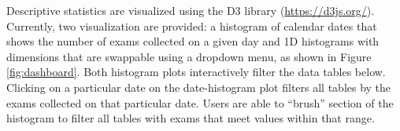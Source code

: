 Descriptive statistics are visualized using the D3 library (\href{https://d3js.org/}{https://d3js.org/}). Currently, two visualization are provided: a histogram of calendar dates that shows the number of exams collected on a given day and 1D histograms with dimensions that are swappable using a dropdown menu, as shown in Figure \ref{fig:dashboard}. Both histogram plots interactively filter the data tables below. Clicking on a particular date on the date-histogram plot filters all tables by the exams collected on that particular date. Users are able to ``brush'' section of the histogram to filter all tables with exams that meet values within that range.  